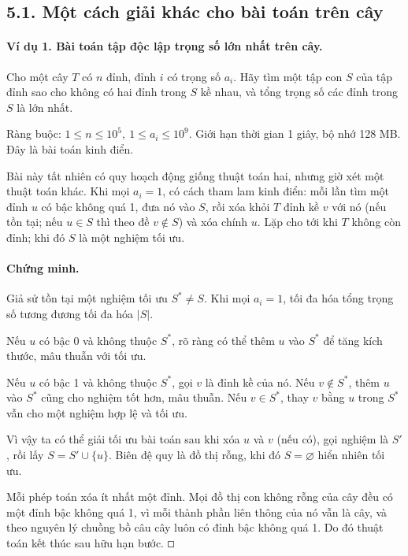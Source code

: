 \documentclass[11pt]{article}
\newcommand{\square}{\mathord{\vcenter{\hrule height .5pt
  \hbox{\vrule width .5pt height 5pt\kern5pt\vrule width .5pt}
  \hrule height .5pt}}}
\begin{document}
\subsection*{5.1. Một cách giải khác cho bài toán trên cây}

\paragraph{Ví dụ 1. Bài toán tập độc lập trọng số lớn nhất trên cây.}
Cho một cây \(T\) có \(n\) đỉnh, đỉnh \(i\) có trọng số \(a_i\). Hãy tìm một
tập con \(S\) của tập đỉnh sao cho không có hai đỉnh trong \(S\) kề nhau, và
tổng trọng số các đỉnh trong \(S\) là lớn nhất.

Ràng buộc: \(1\le n\le10^5,\ 1\le a_i\le10^9\). Giới hạn thời gian 1 giây,
bộ nhớ 128 MB. Đây là bài toán kinh điển.

Bài này tất nhiên có quy hoạch động giống thuật toán hai, nhưng giờ xét một
thuật toán khác. Khi mọi \(a_i=1\), có cách tham lam kinh điển: mỗi lần tìm
một đỉnh \(u\) có bậc không quá 1, đưa nó vào \(S\), rồi xóa khỏi \(T\) đỉnh
kề \(v\) với nó (nếu tồn tại; nếu \(u\in S\) thì theo đề \(v\notin S\)) và xóa
chính \(u\). Lặp cho tới khi \(T\) không còn đỉnh; khi đó \(S\) là một nghiệm
tối ưu.

\paragraph{Chứng minh.}
Giả sử tồn tại một nghiệm tối ưu \(S^\ast\ne S\). Khi mọi \(a_i=1\), tối đa
hóa tổng trọng số tương đương tối đa hóa \(|S|\).

Nếu \(u\) có bậc 0 và không thuộc \(S^\ast\), rõ ràng có thể thêm \(u\) vào
\(S^\ast\) để tăng kích thước, mâu thuẫn với tối ưu.

Nếu \(u\) có bậc 1 và không thuộc \(S^\ast\), gọi \(v\) là đỉnh kề của nó.
Nếu \(v\notin S^\ast\), thêm \(u\) vào \(S^\ast\) cũng cho nghiệm tốt hơn,
mâu thuẫn. Nếu \(v\in S^\ast\), thay \(v\) bằng \(u\) trong \(S^\ast\) vẫn cho
một nghiệm hợp lệ và tối ưu.

Vì vậy ta có thể giải tối ưu bài toán sau khi xóa \(u\) và \(v\) (nếu có),
gọi nghiệm là \(S'\), rồi lấy \(S=S'\cup\{u\}\). Biên đệ quy là đồ thị rỗng,
khi đó \(S=\varnothing\) hiển nhiên tối ưu.

Mỗi phép toán xóa ít nhất một đỉnh. Mọi đồ thị con không rỗng của cây đều có
một đỉnh bậc không quá 1, vì mỗi thành phần liên thông của nó vẫn là cây, và
theo nguyên lý chuồng bồ câu cây luôn có đỉnh bậc không quá 1. Do đó thuật
toán kết thúc sau hữu hạn bước. \(\square\)
\end{document}
